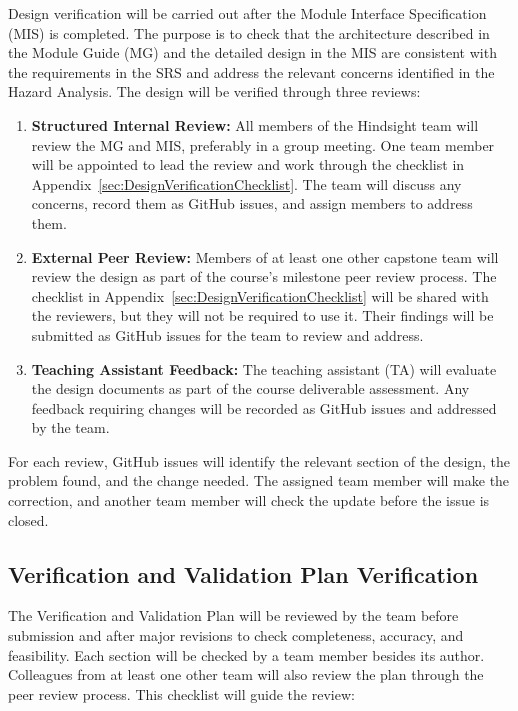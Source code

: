 \documentclass[10pt,titlepage]{article}
\begin{document}
Design verification will be carried out after the Module Interface Specification
(MIS) is completed. The purpose is to check that the architecture described in
the Module Guide (MG) and the detailed design in the MIS are consistent with
the requirements in the SRS and address the relevant concerns identified
in the Hazard Analysis. The design will be verified through three reviews:

\begin{enumerate}
    \item \textbf{Structured Internal Review:} All members of the Hindsight team
    will review the MG and MIS, preferably in a group meeting. One team member
    will be appointed to lead the review and work through the checklist in
    Appendix~\ref{sec:DesignVerificationChecklist}. The team will discuss any
    concerns, record them as GitHub issues, and assign members to address them.

    \item \textbf{External Peer Review:} Members of at least one other capstone
    team will review the design as part of the course's milestone peer review
    process. The checklist in Appendix~\ref{sec:DesignVerificationChecklist}
    will be shared with the reviewers, but they will not be required to use it.
    Their findings will be submitted as GitHub issues for the team to review
    and address.

    \item \textbf{Teaching Assistant Feedback:} The teaching assistant (TA)
    will evaluate the design documents as part of the course deliverable
    assessment. Any feedback requiring changes will be recorded as GitHub
    issues and addressed by the team.
\end{enumerate}

For each review, GitHub issues will identify the relevant section of the design,
the problem found, and the change needed. The assigned team member will make
the correction, and another team member will check the update before the issue
is closed.

\subsection{Verification and Validation Plan Verification}

The Verification and Validation Plan will be reviewed by the team before submission and after major
revisions to check completeness, accuracy, and feasibility. Each section
will be checked by a team member besides its author. Colleagues from at
least one other team will also review the plan through the peer review process.
This checklist will guide the review:
\end{document}
